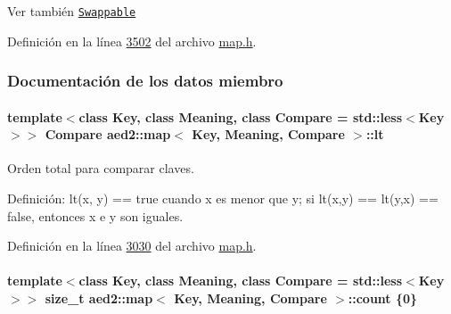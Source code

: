 \begin{DoxySeeAlso}{Ver también}
\href{http://en.cppreference.com/w/cpp/concept/Swappable}{\tt Swappable} 
\end{DoxySeeAlso}


Definición en la línea \hyperlink{map_8h_source_l03502}{3502} del archivo \hyperlink{map_8h_source}{map.\+h}.



\subsubsection{Documentación de los datos miembro}
\paragraph[{\texorpdfstring{lt}{lt}}]{\setlength{\rightskip}{0pt plus 5cm}template$<$class Key, class Meaning, class Compare = std\+::less$<$\+Key$>$$>$ Compare {\bf aed2\+::map}$<$ Key, Meaning, Compare $>$\+::lt\hspace{0.3cm}{\ttfamily [private]}}\hypertarget{classaed2_1_1map_a0e5be36fae0693e4665bd2a615e7550a_a0e5be36fae0693e4665bd2a615e7550a}{}\label{classaed2_1_1map_a0e5be36fae0693e4665bd2a615e7550a_a0e5be36fae0693e4665bd2a615e7550a}


Orden total para comparar claves. 

Definición\+: lt(x, y) == true cuando x es menor que y; si lt(x,y) == lt(y,x) == false, entonces x e y son iguales. 

Definición en la línea \hyperlink{map_8h_source_l03030}{3030} del archivo \hyperlink{map_8h_source}{map.\+h}.

\paragraph[{\texorpdfstring{count}{count}}]{\setlength{\rightskip}{0pt plus 5cm}template$<$class Key, class Meaning, class Compare = std\+::less$<$\+Key$>$$>$ size\+\_\+t {\bf aed2\+::map}$<$ Key, Meaning, Compare $>$\+::count \{0\}\hspace{0.3cm}{\ttfamily [private]}}\hypertarget{classaed2_1_1map_a44236c4f16cdc20a10759862b198bde4_a44236c4f16cdc20a10759862b198bde4}{}\label{classaed2_1_1map_a44236c4f16cdc20a10759862b198bde4_a44236c4f16cdc20a10759862b198bde4}


